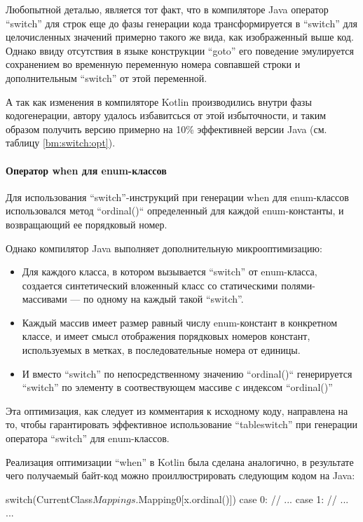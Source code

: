 Любопытной деталью, является тот факт, что в компиляторе Java оператор ``switch'' для строк еще
до фазы генерации кода трансформируется в ``switch'' для целочисленных значений примерно такого же
вида, как изображенный выше код.
Однако ввиду отсутствия в языке конструкции ``goto'' его поведение эмулируется сохранением
во временную переменную номера совпавшей строки и дополнительным ``switch'' от этой переменной.

А так как изменения в компиляторе Kotlin производились внутри фазы кодогенерации, автору удалось
избавитсься от этой избыточности, и таким образом получить версию примерно на 10\% эффективней
версии Java (см. таблицу \ref{bm:switch:opt}).

\paragraph{Оператор when для enum-классов}
Для использования ``switch''-инструкций при генерации when для enum-классов использовался метод
``ordinal()`` определенный для каждой enum-константы, и возвращающий ее порядковый номер.

Однако компилятор Java выполняет дополнительную микрооптимизацию:
\begin{itemize}
    \item Для каждого класса, в котором вызывается ``switch'' от enum-класса, создается
    синтетический вложенный класс со статическими полями-массивами --- по одному на каждый такой
    ``switch''.
    \item Каждый массив имеет размер равный числу enum-констант в конкретном классе, и имеет смысл
    отображения порядковых номеров констант, используемых в метках, в последовательные номера
    от единицы.
    \item И вместо ``switch'' по непосредственному значению ``ordinal()`` генерируется ``switch''
    по элементу в соотвествующем массиве с индексом ``ordinal()''
\end{itemize}

Эта оптимизация, как следует из комментария к исходному коду, направлена на то, чтобы гарантировать
эффективное использование ``tableswitch'' при генерации оператора ``switch'' для enum-классов.

Реализация оптимизации ``when'' в Kotlin была сделана аналогично, в результате чего получаемый
байт-код можно проиллюстрировать следующим кодом на Java:
\begin{pyglist}[language=java]
    switch(CurrentClass$Mappings.$Mapping0[x.ordinal()]) {
        case 0: // ...
        case 1: // ...
        ...
    }
\end{pyglist}


